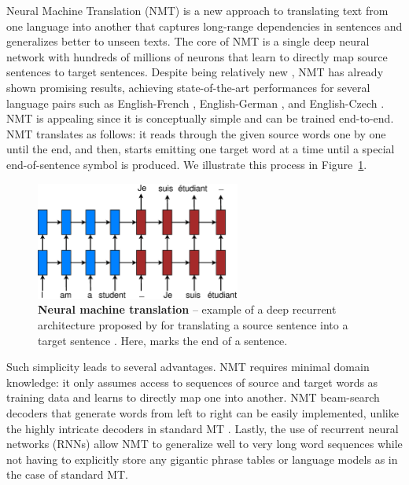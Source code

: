 Neural Machine Translation (NMT) is a new approach to translating text from one
language into another that captures long-range dependencies in sentences and
generalizes better to unseen texts. The core of NMT is a single deep neural
network with hundreds of millions of neurons that learn to directly map source
sentences to target sentences. Despite being relatively new 
\cite{kal13,sutskever14,cho14}, NMT has already shown promising results,
achieving state-of-the-art performances for
several language pairs such as
English-French \cite{luong15}, English-German
\cite{jean15,luong15attn,sennrich16mono}, and
English-Czech \cite{jean15wmt,luong16}. 
NMT is appealing since it is conceptually
simple and can be trained
end-to-end. NMT translates as follows: it reads through the given source
words one by one until the
end, and then, starts emitting one target
word at a time until a special end-of-sentence symbol is produced. We illustrate
this process in Figure~\ref{f:nmt}. 

\begin{figure}[tbh!]
\centering
\includegraphics[width=0.6\textwidth, clip=true, trim= 0 0 0 0]{img/nmt_basic} %
\caption{{\bf Neural machine translation} -- example of a deep recurrent
architecture proposed by  for
translating a source sentence  into a target sentence
. Here, \word{\texttt{\_}} marks the end of a sentence.
} 
\label{f:nmt}
\end{figure}

Such simplicity leads to several advantages. 
NMT requires minimal domain knowledge: it only assumes access to
sequences of source and target words as training data and learns to directly
map one into another. NMT beam-search decoders that
generate words from left to right can be easily implemented, unlike the highly
intricate decoders in standard MT \cite{Koehn:2003:SMT}. Lastly, the use of
recurrent neural networks (RNNs) allow NMT to generalize well to very long word
sequences while not having to 
explicitly store any gigantic
phrase tables or language models as in the case of standard MT.

